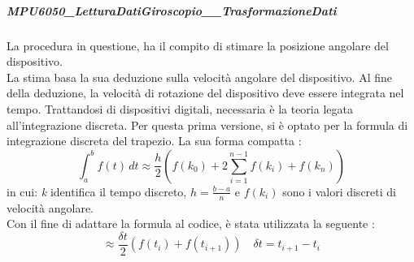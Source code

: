 \subparagraph{MPU6050\_LetturaDatiGiroscopio\_\_TrasformazioneDati}
La procedura in questione, ha il compito di stimare la posizione angolare del dispositivo.\\
La stima basa la sua deduzione sulla velocità angolare del dispositivo. 
Al fine della deduzione, la velocità di rotazione del dispositivo deve essere integrata nel tempo.
Trattandosi di dispositivi digitali, necessaria è la teoria legata all'integrazione discreta.
Per questa prima versione, si è optato per la formula di integrazione discreta del trapezio. La sua forma compatta :
\begin{equation}
    \int_{a}^{b} f(t)\, dt \approx \frac{h}{2} \left( f(k_0) + 2 \sum_{i=1}^{n-1} f(k_i) + f(k_n) \right)
\end{equation}
in cui: \textit{k} identifica il tempo discreto, $h=\frac{b-a}{n}$ e $f(k_i)$ sono i valori discreti di velocità angolare.\\
Con il fine di adattare la formula al codice, è stata utilizzata la seguente :
\begin{equation}
    \approx \frac{\delta t}{2} \left(f(t_i)+f(t_{i+1})\right)  \quad \delta t = t_{i+1} - t_i
\end{equation} 

